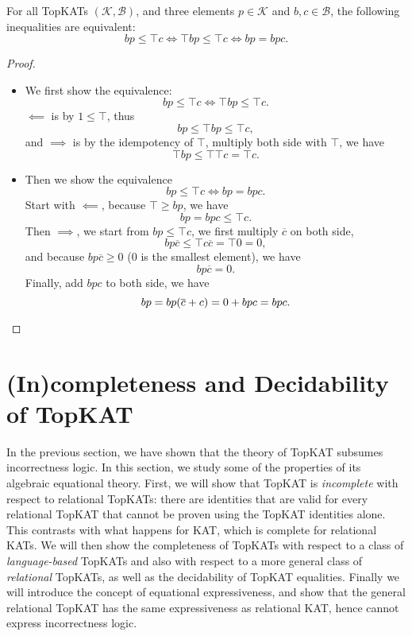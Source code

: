 \begin{theorem}\label{the: hoare logic formulation equivalent}
  For all TopKATs \((𝒦, ℬ)\), and three elements
  \(p \in 𝒦\) and \(b, c \in ℬ\), the following inequalities
  are equivalent:
    \[b p \leq \top c  \iff  \top b p \leq \top c \iff b p = b p c.\]
\end{theorem}

\begin{proof}
\begin{itemize}
    \item We first show the equivalence:
        \[b p \leq \top c  \iff  \top b p \leq \top c.\]
        \(\impliedby\) is by \(1 \leq \top\),
        thus \[b p \leq \top b p \leq \top c,\]
        and \(\implies\) is by the idempotency of \(\top\),
        multiply both side with \(\top\), we have 
        \[\top b p \leq \top \top c = \top c.\]
    \item Then we show the equivalence
        \[b p \leq \top c  \iff  b p = b p c.\]
        Start with \(\impliedby\), because \(\top \geq b p\), we have
        \[b p = b p c \leq \top c.\]
        Then \(\implies\), we start from \(b p \leq \top c\),
        we first multiply \(\overline{c}\) on both side,
        \[b p \overline{c} \leq \top c \overline{c} = \top 0 = 0,\]
        and because \(b p \overline{c} \geq 0\) (\(0\) is the smallest element),
        we have \[b p \overline{c} = 0.\]
        Finally, add \(b p c\) to both side, we have
        \[b p = b p (\overline{c} + c) = 0 + b p c = b p c.\qedhere\]
\end{itemize}
\end{proof}

\section{(In)completeness and Decidability of TopKAT}\label{sec: properties of TopKAT}


In the previous section, we have shown that the theory of TopKAT subsumes incorrectness logic. In this section, we study some of the properties of its algebraic equational theory.
%
First, we will show that TopKAT is \emph{incomplete} with respect to relational
TopKATs: there are identities that are valid for every relational TopKAT that
cannot be proven using the TopKAT identities alone. This contrasts with what
happens for KAT, which is complete for relational KATs.
%
We will then show the completeness of TopKATs with respect to a class of
\emph{language-based} TopKATs and also with respect to a more general class of
\emph{relational} TopKATs, as well as the decidability of TopKAT equalities.
Finally we will introduce the concept of equational expressiveness,
and show that the general relational TopKAT has the same expressiveness as relational KAT,
hence cannot express incorrectness logic.

